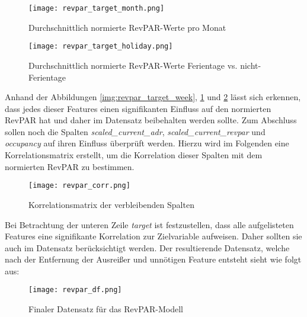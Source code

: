 \begin{figure}[h]
    \centering
    \texttt{[image: revpar\_target\_month.png]}
    \caption[Durchschnittlich normierte RevPAR-Werte pro Monat]{Durchschnittlich normierte RevPAR-Werte pro Monat}
    \label{img:revpar_target_month}
\end{figure}

\newpage

\begin{figure}[h]
    \centering
    \texttt{[image: revpar\_target\_holiday.png]}
    \caption[Durchschnittlich normierte RevPAR-Werte Ferientage vs. nicht-Ferientage]{Durchschnittlich normierte RevPAR-Werte Ferientage vs. nicht-Ferientage}
    \label{img:revpar_target_holiday}
\end{figure}

Anhand der Abbildungen \ref{img:revpar_target_week}, \ref{img:revpar_target_month} und \ref{img:revpar_target_holiday} lässt sich erkennen, dass jedes dieser Features einen signifikanten Einfluss auf den normierten RevPAR hat und daher im Datensatz beibehalten werden sollte.
\newline 
\newline
Zum Abschluss sollen noch die Spalten \emph{scaled\_current\_adr}, \emph{scaled\_current\_revpar} und \emph{occupancy} auf ihren Einfluss überprüft werden. Hierzu wird im Folgenden eine Korrelationsmatrix erstellt, um die Korrelation dieser Spalten mit dem normierten RevPAR zu bestimmen.

\begin{figure}[h]
    \centering
    \texttt{[image: revpar\_corr.png]}
    \caption[Korrelationsmatrix der verbleibenden Spalten]{Korrelationsmatrix der verbleibenden Spalten}
    \label{img:revpar_corr}
\end{figure}

Bei Betrachtung der unteren Zeile \emph{target} ist festzustellen, dass alle aufgelisteten Features eine signifikante Korrelation zur Zielvariable aufweisen. Daher sollten sie auch im Datensatz berücksichtigt werden.
\newline 
\newline 
Der resultierende Datensatz, welche nach der Entfernung der Ausreißer und unnötigen Feature entsteht sieht wie folgt aus:

\begin{figure}[h]
    \centering
    \texttt{[image: revpar\_df.png]}
    \caption[Finaler Datensatz für das RevPAR-Modell]{Finaler Datensatz für das RevPAR-Modell}
    \label{img:revpar_df}
\end{figure}
